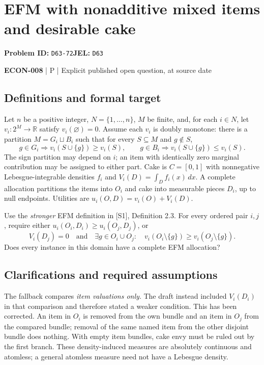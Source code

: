\documentclass[11pt,a4paper]{article}
\begin{document}
\section*{EFM with nonadditive mixed items and desirable cake}
\textbf{Problem ID:} \texttt{D63-72}\quad \textbf{JEL:} \texttt{D63}\par
\label{problem:OP-0594}


\label{audited:ECON-008}

{\sffamily\small\color{muted}\textbf{ECON-008} | P | Explicit published open question, at source date\par}

\subsection*{Definitions and formal target}

Let $n$ be a positive integer, $N=\{1,\ldots,n\}$, $M$ be finite, and, for each $i\in N$, let $v_i:2^M\to\mathbb R$ satisfy $v_i(\varnothing)=0$. Assume each $v_i$ is doubly monotone: there is a partition $M=G_i\sqcup B_i$ such that for every $S\subseteq M$ and $g\notin S$,
\[
g\in G_i\Rightarrow v_i(S\cup\{g\})\geq v_i(S),\qquad
g\in B_i\Rightarrow v_i(S\cup\{g\})\leq v_i(S).
\]
The sign partition may depend on $i$; an item with identically zero marginal contribution may be assigned to either part. Cake is $C=[0,1]$ with nonnegative Lebesgue-integrable densities $f_i$ and $V_i(D)=\int_Df_i(x)\,dx$. A complete allocation partitions the items into $O_i$ and cake into measurable pieces $D_i$, up to null endpoints. Utilities are $u_i(O,D)=v_i(O)+V_i(D)$.

Use the \emph{stronger} EFM definition in [S1], Definition 2.3. For every ordered pair $i,j$, require either $u_i(O_i,D_i)\geq u_i(O_j,D_j)$, or
\[
 V_i(D_j)=0\quad\text{and}\quad
 \exists g\in O_i\cup O_j:\quad
 v_i(O_i\setminus\{g\})\geq v_i(O_j\setminus\{g\}).
\]
Does every instance in this domain have a complete EFM allocation?

\subsection*{Clarifications and required assumptions}

The fallback compares \emph{item valuations only}. The draft instead included $V_i(D_i)$ in that comparison and therefore stated a weaker condition. This has been corrected. An item in $O_i$ is removed from the own bundle and an item in $O_j$ from the compared bundle; removal of the same named item from the other disjoint bundle does nothing. With empty item bundles, cake envy must be ruled out by the first branch. These density-induced measures are absolutely continuous and atomless; a general atomless measure need not have a Lebesgue density.
\end{document}
